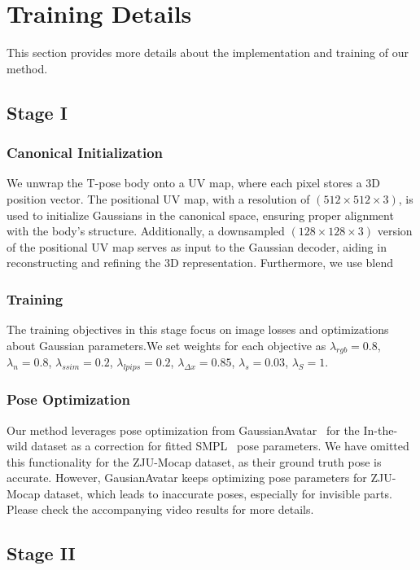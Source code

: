 
\appendices


\section{Training Details}
\label{sec:details}
This section provides more details about the implementation and training of our method.

\subsection{Stage I}
\subsubsection{Canonical Initialization}
We unwrap the T-pose body onto a UV map, where each pixel stores a 3D position vector. The positional UV map, with a resolution of $(512 \times 512 \times 3)$, is used to initialize Gaussians in the canonical space, ensuring proper alignment with the body’s structure. Additionally, a downsampled $(128 \times 128 \times 3)$ version of the positional UV map serves as input to the Gaussian decoder, aiding in reconstructing and refining the 3D representation. 
Furthermore, we use blend
\subsubsection{Training}
The training objectives in this stage focus on image losses and optimizations about Gaussian parameters.We set weights for each objective as $\lambda_{rgb} = 0.8$, $\lambda_{n} = 0.8$, $\lambda_{ssim} = 0.2$, $\lambda_{lpips} = 0.2$, $\lambda_{\Delta x} = 0.85$, $\lambda_{s} = 0.03$, $\lambda_{S} = 1$. 

\subsubsection{Pose Optimization} Our method leverages pose optimization from GaussianAvatar~\cite{hu2023gaussianavatar} for the In-the-wild dataset as a correction for fitted SMPL~\cite{SMPL:2015} pose parameters. We have omitted this functionality for the ZJU-Mocap dataset, as their ground truth pose is accurate. However, GausianAvatar keeps optimizing pose parameters for ZJU-Mocap dataset, which leads to inaccurate poses, especially for invisible parts. Please check the accompanying video results for more details. 
\subsection{Stage II} 
